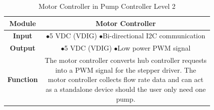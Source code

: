 \documentclass[journal]{IEEEtran}
\begin{document}
            
            \begin{table}[H]
            \renewcommand{\arraystretch}{1.3}
            \caption{Motor Controller in Pump Controller Level 2}
            \label{table:motor_control_2}
                \begin{center}
                    \begin{tabular}{|c|c|}
                        \hline
                        \bfseries Module & Motor Controller \\ \hline
                        \bfseries Input & \makecell[l]{\(\bullet\)5 VDC (VDIG)\\
                                                       \(\bullet\)Bi-directional I2C communication\\
                                                       }\\ \hline
                        \bfseries Output & \makecell[l]{\(\bullet\)5 VDC (VDIG)\\
                                                       \(\bullet\)Low power PWM signal\\
                                                       }\\ \hline
                        \bfseries Function & \makecell[l]{The motor controller converts hub controller requests\\                                   into a PWM signal for the stepper driver. The \\
                                                          motor controller collects flow rate data and can act\\
                                                          as a standalone device should the user only need one\\ pump.}  \\ \hline
                    \end{tabular}
                \end{center}
            \end{table}
            
\end{document}
